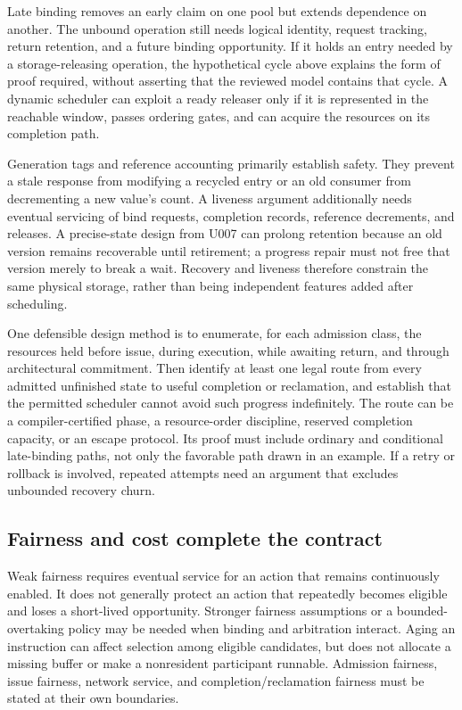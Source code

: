 Late binding removes an early claim on one pool but extends dependence on another. The unbound operation still needs logical identity, request tracking, return retention, and a future binding opportunity. If it holds an entry needed by a storage-releasing operation, the hypothetical cycle above explains the form of proof required, without asserting that the reviewed model contains that cycle. A dynamic scheduler can exploit a ready releaser only if it is represented in the reachable window, passes ordering gates, and can acquire the resources on its completion path.

Generation tags and reference accounting primarily establish safety. They prevent a stale response from modifying a recycled entry or an old consumer from decrementing a new value's count. A liveness argument additionally needs eventual servicing of bind requests, completion records, reference decrements, and releases. A precise-state design from U007 can prolong retention because an old version remains recoverable until retirement; a progress repair must not free that version merely to break a wait. Recovery and liveness therefore constrain the same physical storage, rather than being independent features added after scheduling.

One defensible design method is to enumerate, for each admission class, the resources held before issue, during execution, while awaiting return, and through architectural commitment. Then identify at least one legal route from every admitted unfinished state to useful completion or reclamation, and establish that the permitted scheduler cannot avoid such progress indefinitely. The route can be a compiler-certified phase, a resource-order discipline, reserved completion capacity, or an escape protocol. Its proof must include ordinary and conditional late-binding paths, not only the favorable path drawn in an example. If a retry or rollback is involved, repeated attempts need an argument that excludes unbounded recovery churn.

\subsection{Fairness and cost complete the contract}

Weak fairness requires eventual service for an action that remains continuously enabled. It does not generally protect an action that repeatedly becomes eligible and loses a short-lived opportunity. Stronger fairness assumptions or a bounded-overtaking policy may be needed when binding and arbitration interact. Aging an instruction can affect selection among eligible candidates, but does not allocate a missing buffer or make a nonresident participant runnable. Admission fairness, issue fairness, network service, and completion/reclamation fairness must be stated at their own boundaries.

